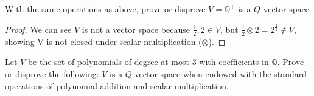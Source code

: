 \documentclass[11pt]{article}
\newcommand{\Q}{\mathbb{Q}}
\begin{document}
\begin{problem}[Problem 1C]
    With the same operations as above, prove or disprove $V=\Q^+$ is a $Q\text{-vector space}$
\end{problem}
\begin{proof}
We can see $V$ is not a vector space because $\frac{1}{2}, 2 \in V$, but $\frac{1}{2} \otimes 2 = 2^{\tfrac{1}{2}} \notin V$, showing V is not closed under scalar multiplication ($\otimes$).
\end{proof}

\begin{problem}[Problem 1D]
    Let $V$ be the set of polynomials of degree at most $3$ with coefficients in $\Q$. Prove or disprove the following: $V$ is a $Q$ vector space when endowed with the standard operations of polynomial addition and scalar multiplication.
\end{problem}
\end{document}
